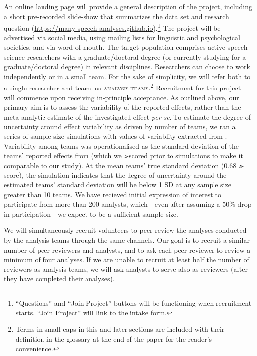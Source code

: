 \documentclass[Review,times,sageh]{sagej}
\begin{document}
An online landing page will provide a general description of the project, including a short pre-recorded slide-show that summarizes the data set and research question (\url{https://many-speech-analyses.github.io}).\footnote{``Questions'' and ``Join Project'' buttons will be functioning when recruitment starts. ``Join Project'' will link to the intake form.}
The project will be advertised via social media, using mailing lists for linguistic and psychological societies, and via word of mouth.
The target population comprises active speech science researchers with a graduate/doctoral degree (or currently studying for a graduate/doctoral degree) in relevant disciplines.
Researchers can choose to work independently or in a small team.
For the sake of simplicity, we will refer both to a single researcher and teams as \textsc{analysis teams}.\footnote{Terms in small caps in this and later sections are included with their definition in the glossary at the end of the paper for the reader's convenience.}
Recruitment for this project will commence upon receiving in-principle acceptance.
As outlined above, our primary aim is to assess the variability of the reported effects, rather than the meta-analytic estimate of the investigated effect \emph{per se}.
To estimate the degree of uncertainty around effect variability as driven by number of teams, we ran a series of sample size simulations with values of variablity extracted from \citet{silberzahn2018many}.
Variability among teams was operationalised as the standard deviation of the teams' reported effects from \citet{silberzahn2018many} (which we \emph{z}-scored prior to simulations to make it comparable to our study).
At the mean teams' true standard deviation (0.68 \emph{z}-score), the simulation indicates that the degree of uncertainty around the estimated teams' standard deviation will be below 1 SD at any sample size greater than 10 teams.
We have recieved initial expression of interest to participate from more than 200 analysts, which---even after assuming a 50\% drop in participation---we expect to be a sufficient sample size.

We will simultaneously recruit volunteers to peer-review the analyses conducted by the analysis teams through the same channels.
Our goal is to recruit a similar number of peer-reviewers and analysts, and to ask each peer-reviewer to review a minimum of four analyses.
If we are unable to recruit at least half the number of reviewers as analysis teams, we will ask analysts to serve also as reviewers (after they have completed their analyses).
\end{document}
